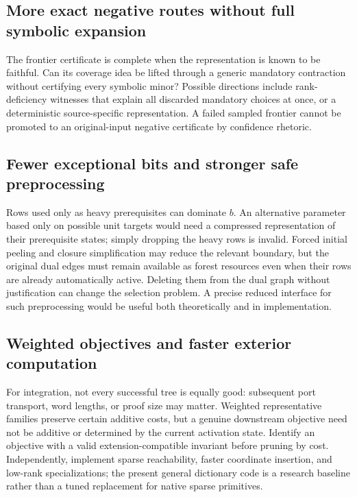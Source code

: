 \documentclass[11pt,letterpaper]{article}
\theoremstyle{definition}
\begin{document}
\subsection{More exact negative routes without full symbolic expansion}
The frontier certificate is complete when the representation is known to be
faithful. Can its coverage idea be lifted through a generic mandatory
contraction without certifying every symbolic minor? Possible directions
include rank-deficiency witnesses that explain all discarded mandatory
choices at once, or a deterministic source-specific representation.
A failed sampled frontier cannot be promoted to an original-input negative
certificate by confidence rhetoric.

\subsection{Fewer exceptional bits and stronger safe preprocessing}
Rows used only as heavy prerequisites can dominate $b$. An alternative
parameter based only on possible unit targets would need a compressed
representation of their prerequisite states; simply dropping the heavy rows
is invalid. Forced initial peeling and closure simplification may reduce the
relevant boundary, but the original dual edges must remain available as
forest resources even when their rows are already automatically active.
Deleting them from the dual graph without justification can change the
selection problem. A precise reduced interface for such preprocessing would
be useful both theoretically and in implementation.

\subsection{Weighted objectives and faster exterior computation}
For integration, not every successful tree is equally good: subsequent port
transport, word lengths, or proof size may matter. Weighted representative
families preserve certain additive costs, but a genuine downstream objective
need not be additive or determined by the current activation state. Identify
an objective with a valid extension-compatible invariant before pruning by
cost. Independently, implement sparse reachability, faster coordinate
insertion, and low-rank specializations; the present general dictionary code
is a research baseline rather than a tuned replacement for native sparse
primitives.
\end{document}
